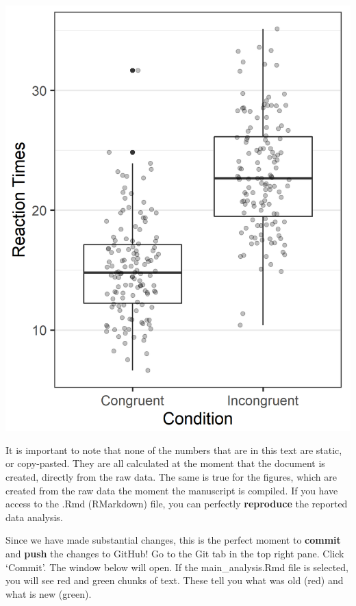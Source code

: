 \documentclass[
  oneside]{book}
\begin{document}
\begin{center}\includegraphics[width=1\linewidth]{images/dc72012da17d44752af4ab572c6c20d2} \end{center}

It is important to note that none of the numbers that are in this text are
static, or copy-pasted. They are all calculated at the moment that the document
is created, directly from the raw data. The same is true for the figures, which
are created from the raw data the moment the manuscript is compiled. If you have
access to the .Rmd (RMarkdown) file, you can perfectly \textbf{reproduce} the
reported data analysis.

Since we have made substantial changes, this is the perfect moment to \textbf{commit}
and \textbf{push} the changes to GitHub! Go to the Git tab in the top right pane.
Click `Commit'. The window below will open. If the main\_analysis.Rmd file is
selected, you will see red and green chunks of text. These tell you what was old
(red) and what is new (green).
\end{document}
